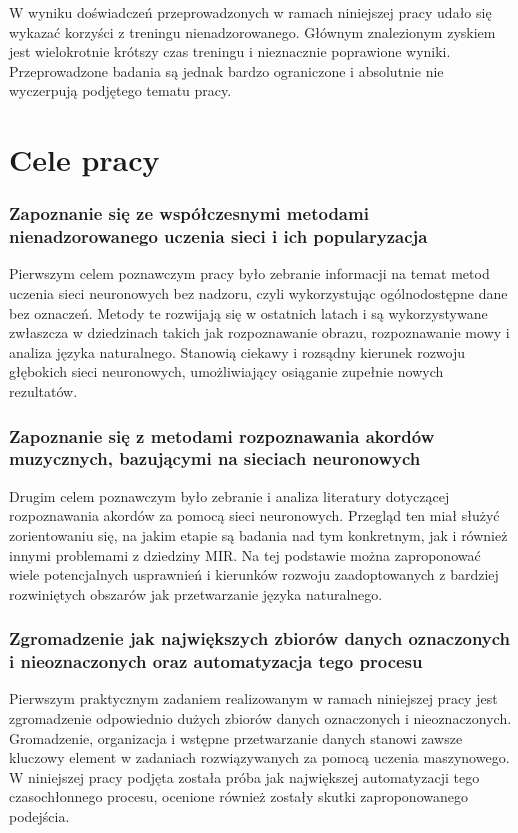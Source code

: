 W wyniku doświadczeń przeprowadzonych w ramach niniejszej pracy udało się wykazać korzyści z treningu nienadzorowanego. Głównym znalezionym zyskiem jest wielokrotnie krótszy czas treningu i nieznacznie poprawione wyniki. Przeprowadzone badania są jednak bardzo ograniczone i absolutnie nie wyczerpują podjętego tematu pracy.



\section{Cele pracy}

\subsubsection{Zapoznanie się ze współczesnymi metodami nienadzorowanego uczenia sieci i ich popularyzacja}

Pierwszym celem poznawczym pracy było zebranie informacji na temat metod uczenia sieci neuronowych bez nadzoru, czyli wykorzystując ogólnodostępne dane bez oznaczeń. Metody te rozwijają się w ostatnich latach i są wykorzystywane zwłaszcza w dziedzinach takich jak rozpoznawanie obrazu, rozpoznawanie mowy i analiza języka naturalnego. Stanowią ciekawy i rozsądny kierunek rozwoju głębokich sieci neuronowych, umożliwiający osiąganie zupełnie nowych rezultatów.

\subsubsection{Zapoznanie się z metodami rozpoznawania akordów muzycznych, bazującymi na sieciach neuronowych}

Drugim celem poznawczym było zebranie i analiza literatury dotyczącej rozpoznawania akordów za pomocą sieci neuronowych. Przegląd ten miał służyć zorientowaniu się, na jakim etapie są badania nad tym konkretnym, jak i również innymi problemami z dziedziny MIR. Na tej podstawie można zaproponować wiele potencjalnych usprawnień i kierunków rozwoju zaadoptowanych z bardziej rozwiniętych obszarów jak przetwarzanie języka naturalnego.

\subsubsection{Zgromadzenie jak największych zbiorów danych oznaczonych i nieoznaczonych oraz automatyzacja tego procesu}

Pierwszym praktycznym zadaniem realizowanym w ramach niniejszej pracy jest zgromadzenie odpowiednio dużych zbiorów danych oznaczonych i nieoznaczonych. Gromadzenie, organizacja i wstępne przetwarzanie danych stanowi zawsze kluczowy element w zadaniach rozwiązywanych za pomocą uczenia maszynowego. W niniejszej pracy podjęta została próba jak największej automatyzacji tego czasochłonnego procesu, ocenione również zostały skutki zaproponowanego podejścia.


